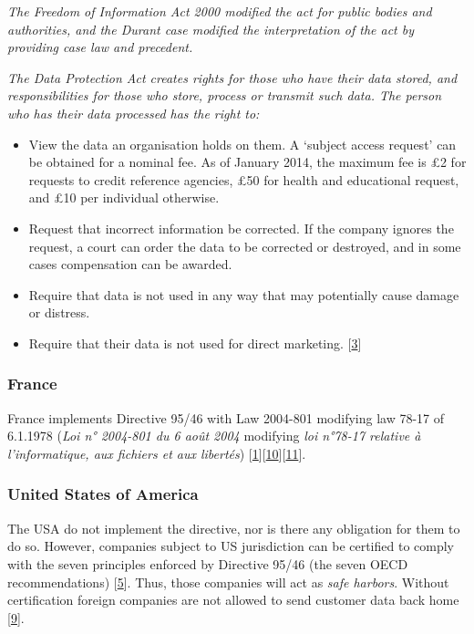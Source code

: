 \emph{The Freedom of Information Act 2000 modified the act for public bodies and authorities, and the Durant case modified the interpretation of the act by providing case law and precedent.}

\emph{The Data Protection Act creates rights for those who have their data stored, and responsibilities for those who store, process or transmit such data.
The person who has their data processed has the right to:}

\begin{itemize}

\item
View the data an organisation holds on them.
A `subject access request' can be obtained for a nominal fee. As of January 2014, the maximum fee is £2 for requests to credit reference agencies, £50 for health and educational request, and £10 per individual otherwise.

\item
Request that incorrect information be corrected.
If the company ignores the request, a court can order the data to be corrected or destroyed, and in some cases compensation can be awarded.

\item
Require that data is not used in any way that may potentially cause damage or distress.

\item
Require that their data is not used for direct marketing. {[}\hyperref[references]{3}{]}
\end{itemize}

\subsubsection*{France}

France implements Directive 95/46 with Law 2004-801 modifying law 78-17 of 6.1.1978 (\emph{Loi n° 2004-801 du 6 août 2004} modifying \emph{loi n°78-17 relative à l'informatique, aux fichiers et aux libertés}) {[}\hyperref[references]{1}{]}{[}\hyperref[references]{10}{]}{[}\hyperref[references]{11}{]}.

\subsubsection*{United States of America}

The USA do not implement the directive, nor is there any obligation for them to do so.
However, companies subject to US jurisdiction can be certified to comply with the seven principles enforced by Directive 95/46 (the seven OECD recommendations) {[}\hyperref[references]{5}{]}.
Thus, those companies will act as \emph{safe harbors}. Without certification foreign companies are not allowed to send customer data back home {[}\hyperref[references]{9}{]}.


